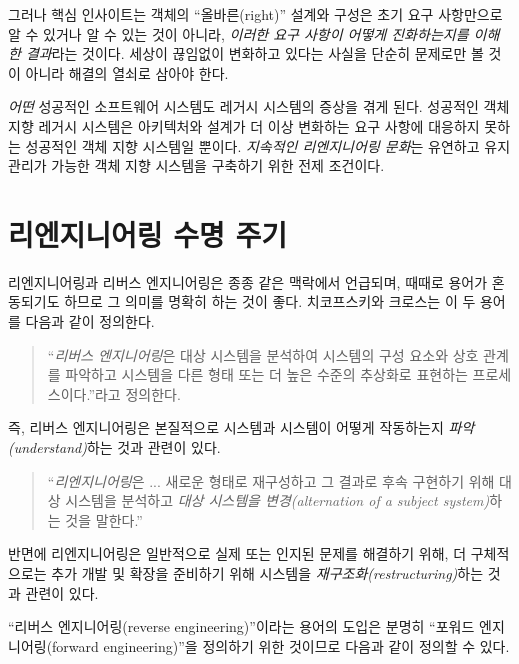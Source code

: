 \documentclass[a4paper,10pt,twoside]{book}
\begin{document}
그러나 핵심 인사이트는 객체의 ``올바른(right)'' 설계와 구성은 초기 요구 사항만으로 알 수 있거나 알 수 있는 것이 아니라, \emph{이러한 요구 사항이 어떻게 진화하는지를 이해한 결과}라는 것이다. 세상이 끊임없이 변화하고 있다는 사실을 단순히 문제로만 볼 것이 아니라 해결의 열쇠로 삼아야 한다. 

\emph{어떤} 성공적인 소프트웨어 시스템도 레거시 시스템의 증상을 겪게 된다. 성공적인 객체 지향 레거시 시스템은 아키텍처와 설계가 더 이상 변화하는 요구 사항에 대응하지 못하는 성공적인 객체 지향 시스템일 뿐이다. \emph{지속적인 리엔지니어링 문화}는 유연하고 유지 관리가 가능한 객체 지향 시스템을 구축하기 위한 전제 조건이다.

\section{리엔지니어링 수명 주기}

리엔지니어링과 리버스 엔지니어링은 종종 같은 맥락에서 언급되며, 때때로 용어가 혼동되기도 하므로 그 의미를 명확히 하는 것이 좋다. 치코프스키와 크로스는 이 두 용어를 다음과 같이 정의한다.

\begin{quotation}
\noindent
``\emph{리버스 엔지니어링}은 대상 시스템을 분석하여 시스템의 구성 요소와 상호 관계를 파악하고 시스템을 다른 형태 또는 더 높은 수준의 추상화로 표현하는 프로세스이다.''라고 정의한다. 
\end{quotation}

즉, 리버스 엔지니어링은 본질적으로 시스템과 시스템이 어떻게 작동하는지 \emph{파악(understand)}하는 것과 관련이 있다.

\begin{quotation}
\noindent
``\emph{리엔지니어링}은 ... 새로운 형태로 재구성하고 그 결과로 후속 구현하기 위해 대상 시스템을 분석하고 \emph{대상 시스템을 변경(alternation of a subject system)}하는 것을 말한다.''
\end{quotation}

반면에 리엔지니어링은 일반적으로 실제 또는 인지된 문제를 해결하기 위해, 더 구체적으로는 추가 개발 및 확장을 준비하기 위해 시스템을 \emph{재구조화(restructuring)}하는 것과 관련이 있다.

``리버스 엔지니어링(reverse engineering)''이라는 용어의 도입은 분명히 ``포워드 엔지니어링(forward engineering)''을 정의하기 위한 것이므로 다음과 같이 정의할 수 있다.
\end{document}
